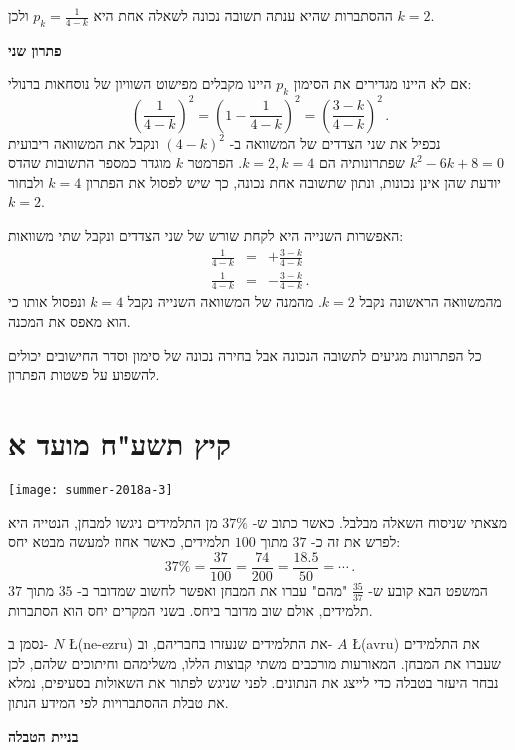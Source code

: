  ההסתברות שהיא ענתה תשובה נכונה לשאלה אחת היא
$p_k=\displaystyle\frac{1}{4-k}$
ולכן 
$k=2$.

\textbf{פתרון שני}

אם לא היינו מגדירים את הסימון
$p_k$
היינו מקבלים מפישוט השוויון של נוסחאות ברנולי:
\[
\left(\frac{1}{4-k}\right)^2 =\left(1-\frac{1}{4-k}\right)^2=\left(\frac{3-k}{4-k}\right)^2\,.
\]
נכפיל את שני הצדדים של המשוואה ב-%
$(4-k)^2$
ונקבל את המשוואה ריבועית
$k^2-6k+8=0$
שפתרונותיה הם 
$k=2,k=4$.
הפרמטר
$k$
מוגדר כמספר התשובות שהדס יודעת שהן אינן נכונות, ונתון שתשובה אחת נכונה, כך שיש לפסול את הפתרון
$k=4$
ולבחור
$k=2$.

האפשרות השנייה היא לקחת שורש של שני הצדדים ונקבל שתי משוואות:
\begin{eqnarray*}
\frac{1}{4-k}&=&+\frac{3-k}{4-k}\\
\frac{1}{4-k}&=&-\frac{3-k}{4-k}\,.
\end{eqnarray*}
מהמשוואה הראשונה נקבל
$k=2$.
מהמנה של המשוואה השנייה נקבל 
$k=4$
ונפסול אותו כי הוא מאפס את המכנה.

כל הפתרונות מגיעים לתשובה הנכונה אבל בחירה נכונה של סימון וסדר החישובים יכולים להשפוע על פשטות הפתרון.


\newpage

\section{קיץ תשע"ח מועד א}

\begin{center}
\texttt{[image: summer-2018a-3]}
\end{center}

מצאתי שניסוח השאלה מבלבל. כאשר כתוב ש-%
$37\%$
מן התלמידים ניגשו למבחן, הנטייה היא לפרש את זה כ-%
$37$
מתוך
$100$
תלמידים, כאשר אחוז למעשה מבטא יחס:
\[
37\% = \frac{37}{100} = \frac{74}{200} = \frac{18.5}{50} = \cdots\,.
\]
המשפט הבא קובע ש-%
$\frac{35}{37}$
"מהם" עברו את המבחן ואפשר לחשוב שמדובר ב-%
$35$
מתוך
$37$
תלמידים, אולם שוב מדובר ביחס. בשני המקרים יחס הוא הסתברות.

נסמן ב-%
$N$ 
\L{(ne-ezru)}
את התלמידים שנעזרו בחבריהם, וב-%
$A$
\L{(avru)}
את התלמידים שעברו את המבחן. המאורעות מורכבים משתי קבוצות הללו, משלימהם וחיתוכים שלהם, לכן נבחר היעזר בטבלה כדי לייצג את הנתונים. 
לפני שניגש לפתור את השאולות בסעיפים, נמלא את טבלת ההסתברויות לפי המידע הנתון.

\textbf{בניית הטבלה}

